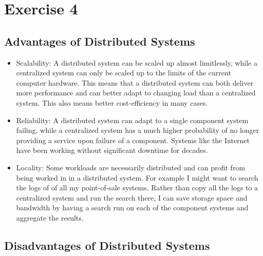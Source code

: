 \documentclass[a4paper]{article}
\begin{document}
\section{Exercise 4}

\subsection{Advantages of Distributed Systems}

\begin{itemize}

    \item Scalability: A distributed system can be scaled up almost limitlessly, while a centralized system can only be scaled up to the limits of the current computer hardware. This means that a distributed system can both deliver more performance and can better adapt to changing load than a centralized system. This also means better cost-efficiency in many cases.

    \item Reliability: A distributed system can adapt to a single component system failing, while a centralized system has a much higher probability of no longer providing a service upon failure of a component. Systems like the Internet have been working without significant downtime for decades.

    \item Locality: Some workloads are necessarily distributed and can profit from being worked in in a distributed system. For example I might want to search the logs of of all my point-of-sale systems. Rather than copy all the logs to a centralized system and run the search there, I can save storage space and bandwidth by having a search run on each of the component systems and aggregate the results.
\end{itemize}

\subsection{Disadvantages of Distributed Systems}
\end{document}
